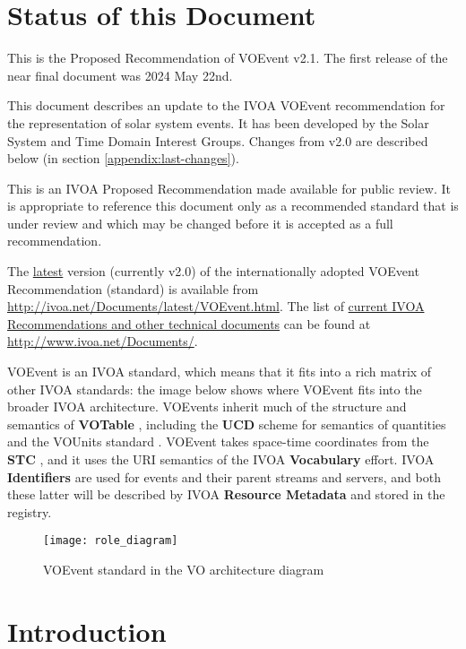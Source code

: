 \documentclass[11pt,a4paper]{ivoa}
\begin{document}
\section*{Status of this Document}
This is the Proposed Recommendation of VOEvent v2.1. The first release of the
near final document was 2024 May 22nd.

This document describes an update to the IVOA VOEvent recommendation for the
representation of solar system events. It has been developed by the Solar System
and Time Domain Interest Groups. Changes from v2.0 are described below (in
section \ref{appendix:last-changes}).

This is an IVOA Proposed Recommendation made available for public review. It is
appropriate to reference this document only as a recommended standard that is
under review and which may be changed before it is accepted as a full
recommendation.

The \href{http://ivoa.net/Documents/latest/VOEvent.html}{latest} version
(currently v2.0) of the internationally adopted VOEvent Recommendation
(standard) is available from \url{http://ivoa.net/Documents/latest/VOEvent.html}.
The list of \href{http://www.ivoa.net/Documents/}{current IVOA Recommendations
and other technical documents} can be found at \url{http://www.ivoa.net/Documents/}.

VOEvent is an IVOA standard, which means that it fits into a rich matrix of
other IVOA standards: the image below shows where VOEvent fits into the broader
IVOA architecture. VOEvents inherit much of the structure and semantics of {\bf
VOTable} \citep{2019ivoa.spec.1021O}, including the {\bf UCD}
\citep{2018ivoa.spec.0527P} scheme for semantics of quantities and the VOUnits
standard \citep{2014ivoa.spec.0523D}. VOEvent takes space-time coordinates from
the {\bf STC} \citep{2007ivoa.spec.1030R}, and it uses the URI semantics of the
IVOA {\bf Vocabulary} \citep{2009ivoa.spec.1007G} effort. IVOA {\bf Identifiers}
\citep{2016ivoa.spec.0523D} are used for events and their parent streams and
servers, and both these latter will be described by IVOA {\bf Resource Metadata}
\citep{2007ivoa.spec.0302H} and stored in the registry.

\begin{figure}[ht!]
\centering\texttt{[image: role\_diagram]}
\caption{VOEvent standard in the VO architecture diagram}
\label{fig:diagram}
\end{figure}

\section{Introduction}
\end{document}
